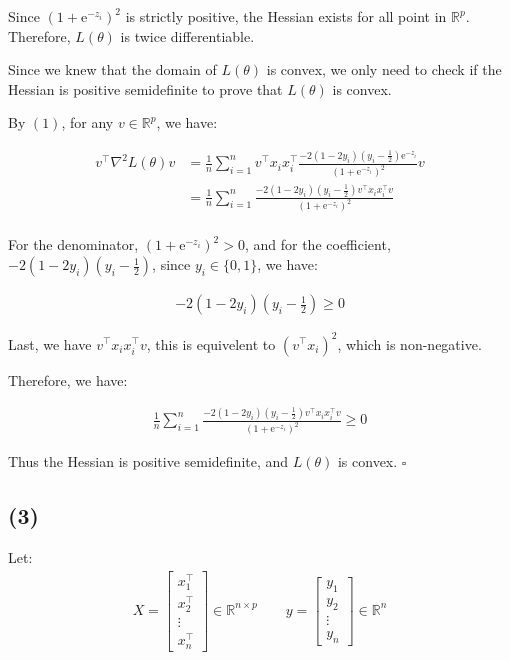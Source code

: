 \documentclass{article}
\begin{document}
Since $(1 +\mathrm{e}^{-z_i})^2$ is strictly positive, the Hessian exists for all point in $\mathbb{R}^p$.
Therefore, $L(\theta)$ is twice differentiable.
\bigskip

Since we knew that the domain of $L(\theta)$ is convex, 
we only need to check if the Hessian is positive semidefinite to prove that $L(\theta)$ is convex.
\bigskip

By $(1)$, for any $v \in \mathbb{R}^p$, we have:

\begin{align*}
    v^\intercal  \nabla^2 L(\theta) v
    &= \frac{1}{n} \sum_{i = 1}^n v^\intercal  x_i x_i^\intercal  \frac{-2(1 - 2y_i)(y_i - \frac{1}{2})\mathrm{e}^{-z_i}}{(1 +\mathrm{e}^{-z_i})^2} v \\
    &= \frac{1}{n} \sum_{i = 1}^n \frac{-2(1 - 2y_i)(y_i - \frac{1}{2})v^\intercal  x_i x_i^\intercal  v}{(1 +\mathrm{e}^{-z_i})^2} \\
\end{align*}

For the denominator, $(1 +\mathrm{e}^{-z_i})^2 > 0$, 
and for the coefficient, $-2(1 - 2y_i)(y_i - \frac{1}{2})$, 
since $y_i \in \{0, 1\}$, we have:

\begin{align*}
    -2(1 - 2y_i)(y_i - \frac{1}{2}) \ge 0
\end{align*}

Last, we have $v^\intercal  x_i x_i^\intercal  v$, this is equivelent to $(v^\intercal x_i)^2$, which is non-negative.

Therefore, we have:

\begin{align*}
    \frac{1}{n} \sum_{i = 1}^n \frac{-2(1 - 2y_i)(y_i - \frac{1}{2})v^\intercal  x_i x_i^\intercal  v}{(1 +\mathrm{e}^{-z_i})^2} \ge 0
\end{align*}

Thus the Hessian is positive semidefinite, and $L(\theta)$ is convex. $\square$

\subsection*{(3)}

Let: 
\begin{align*}
    X = \begin{bmatrix}
        x_1^\intercal  \\
        x_2^\intercal  \\
        \vdots \\
        x_n^\intercal 
    \end{bmatrix}
    \in \mathbb{R}^{n \times p}
    \qquad
    y = \begin{bmatrix}
        y_1 \\
        y_2 \\
        \vdots \\
        y_n
    \end{bmatrix}
    \in \mathbb{R}^n
\end{align*}
\end{document}
